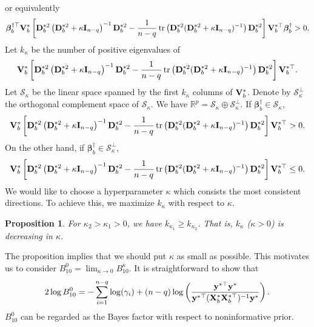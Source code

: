 \documentclass[11pt]{article}
\DeclareMathOperator{\mytr}{tr}
\newcommand{\By}{\mathbf{y}}    \newcommand{\Bz}{\mathbf{z}}
\newcommand{\bfsym}[1]{\ensuremath{\boldsymbol{#1}}}
\def\bbeta{\bfsym \beta}
\theoremstyle{plain}
\newtheorem{proposition}{\quad\quad Proposition}
\theoremstyle{definition}
\theoremstyle{remark}
\begin{document}
or equivalently
\begin{equation*}
    \bbeta_b^{\dagger \top} \BV_b^*
\left[
    \BD_b^{*2} \left( \BD_b^{*2} + \kappa \BI_{n-q} \right)^{-1} \BD_b^{*2} 
-\frac{1}{n-q} \mytr \left( \BD_b^{*2} ( \BD_b^{*2} + \kappa \BI_{n-q})^{-1}\right)
     \BD_b^{*2} 
\right]
    \BV_b^{*\top} \bbeta_b^{\dagger}
    >0.
\end{equation*}
Let $k_{\kappa}$ be the number of positive eigenvalues of
\begin{equation*}
    \BV_b^*
\left[
    \BD_b^{*2} \left( \BD_b^{*2} + \kappa \BI_{n-q} \right)^{-1} \BD_b^{*2} 
-\frac{1}{n-q} \mytr \left( \BD_b^{*2} ( \BD_b^{*2} + \kappa \BI_{n-q})^{-1}\right)
     \BD_b^{*2} 
\right]
\BV_b^{*\top}.
\end{equation*}
Let $\mathcal S_{\kappa}$ be the linear space spanned by the first $k_{\kappa}$ columns of $\mathbf{V}_{b}^*$.
Denote by $\mathcal S_{\kappa}^{\bot}$ the orthogonal complement space of $\mathcal S_\kappa$.
We have $\mathbb R^p=\mathcal S_\kappa \oplus \mathcal  S_{\kappa}^{\bot}$.
If $\bbeta_b^\dagger \in \mathcal S_\kappa$,
\begin{equation*}
    \BV_b^*
\left[
    \BD_b^{*2} \left( \BD_b^{*2} + \kappa \BI_{n-q} \right)^{-1} \BD_b^{*2} 
-\frac{1}{n-q} \mytr \left( \BD_b^{*2} ( \BD_b^{*2} + \kappa \BI_{n-q})^{-1}\right)
     \BD_b^{*2} 
\right]
\BV_b^{*\top}>0.
\end{equation*}
On the other hand, if $\bbeta_b^\dagger \in \mathcal S_{\kappa}^\bot$,
\begin{equation*}
    \BV_b^*
\left[
    \BD_b^{*2} \left( \BD_b^{*2} + \kappa \BI_{n-q} \right)^{-1} \BD_b^{*2} 
-\frac{1}{n-q} \mytr \left( \BD_b^{*2} ( \BD_b^{*2} + \kappa \BI_{n-q})^{-1}\right)
     \BD_b^{*2} 
\right]
\BV_b^{*\top}\leq 0.
\end{equation*}
We would like to choose a hyperparameter $\kappa$ which consists the most consistent directions.
To achieve this, we maximize $k_{\kappa}$ with respect to $\kappa$.

\begin{proposition}\label{prop:monotone}
    For $ \kappa _2 > \kappa_1 > 0$, we have
    $k_{\kappa_1} \geq k_{\kappa_2}$.
    That is, $k_{\kappa}$ ($\kappa>0$) is decreasing in $\kappa$.
\end{proposition}
The proposition implies that we should put $\kappa$ as small as possible.
This motivates us to consider $B_{10}^0=\lim_{\kappa\to 0} B_{10}^\kappa$.
It is straightforward to show that
\begin{equation*}
    2\log B_{10}^0= 
         - \sum_{i=1}^{n-q}\log ( \gamma_i )
         +(n-q)\log\left(\frac{\By^{*\top} \By^*}{\By^{*\top} ( \BX_b^* \BX_b^{*\top} )^{-1} \By^* }\right)
         .
\end{equation*}
$B_{10}^0$ can be regarded as the Bayes factor with respect to noninformative prior.
\end{document}
